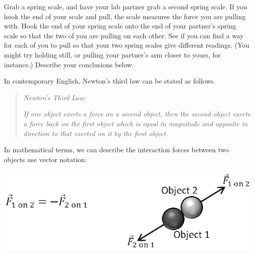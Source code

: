 
Grab a spring scale, and have your lab partner grab a second spring scale.  
If you hook the end of your scale and pull, the scale measures the force you are pulling with.
Hook the end of your spring scale onto the end of your partner's spring scale so that the two of you
are pulling on each other.  
See if you can find a way for each of you to pull so that your two spring scales give different readings.
(You might try holding still, or pulling your partner's arm closer to yours, for instance.)
Describe your conclusions below. 

\answerspace{30mm}

In contemporary English, Newton's third law can be stated as follows.

\begin{quote}
\textit{Newton's Third Law:}

\textit{If one object exerts a force on a second object, then the second object
exerts a force back on the first object which is equal in magnitude and opposite
in direction to that exerted on it by the first object.}
\end{quote}

In mathematical terms, we can describe the interaction forces between 
two objects use vector notation:

\vspace{0.3cm}
{\par\centering \includegraphics{newton/newton_fig2_new.eps} \par}
\vspace{0.3cm}


